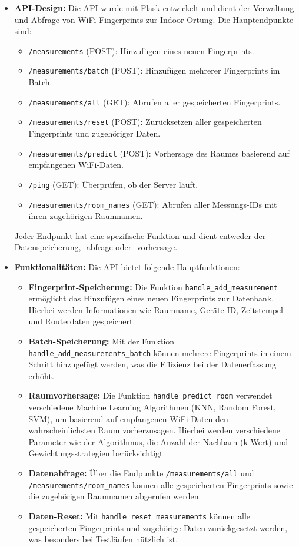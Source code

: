 \begin{itemize}
    \item \textbf{API-Design:} Die API wurde mit Flask entwickelt und dient der Verwaltung und Abfrage von WiFi-Fingerprints zur Indoor-Ortung. Die Hauptendpunkte sind:
          \begin{itemize}
              \item \texttt{/measurements} (POST): Hinzufügen eines neuen Fingerprints.
              \item \texttt{/measurements/batch} (POST): Hinzufügen mehrerer Fingerprints im Batch.
              \item \texttt{/measurements/all} (GET): Abrufen aller gespeicherten Fingerprints.
              \item \texttt{/measurements/reset} (POST): Zurücksetzen aller gespeicherten Fingerprints und zugehöriger Daten.
              \item \texttt{/measurements/predict} (POST): Vorhersage des Raumes basierend auf empfangenen WiFi-Daten.
              \item \texttt{/ping} (GET): Überprüfen, ob der Server läuft.
              \item \texttt{/measurements/room\_names} (GET): Abrufen aller Messungs-IDs mit ihren zugehörigen Raumnamen.
          \end{itemize}
          Jeder Endpunkt hat eine spezifische Funktion und dient entweder der Datenspeicherung, -abfrage oder -vorhersage.

    \item \textbf{Funktionalitäten:} Die API bietet folgende Hauptfunktionen:
          \begin{itemize}
              \item \textbf{Fingerprint-Speicherung:} Die Funktion \texttt{handle\_add\_measurement} ermöglicht das Hinzufügen eines neuen Fingerprints zur Datenbank. Hierbei werden Informationen wie Raumname, Geräte-ID, Zeitstempel und Routerdaten gespeichert.
              \item \textbf{Batch-Speicherung:} Mit der Funktion \texttt{handle\_add\_measurements\_batch} können mehrere Fingerprints in einem Schritt hinzugefügt werden, was die Effizienz bei der Datenerfassung erhöht.
              \item \textbf{Raumvorhersage:} Die Funktion \texttt{handle\_predict\_room} verwendet verschiedene Machine Learning Algorithmen (KNN, Random Forest, SVM), um basierend auf empfangenen WiFi-Daten den wahrscheinlichsten Raum vorherzusagen. Hierbei werden verschiedene Parameter wie der Algorithmus, die Anzahl der Nachbarn (k-Wert) und Gewichtungsstrategien berücksichtigt.
              \item \textbf{Datenabfrage:} Über die Endpunkte \texttt{/measurements/all} und \texttt{/measurements/room\_names} können alle gespeicherten Fingerprints sowie die zugehörigen Raumnamen abgerufen werden.
              \item \textbf{Daten-Reset:} Mit \texttt{handle\_reset\_measurements} können alle gespeicherten Fingerprints und zugehörige Daten zurückgesetzt werden, was besonders bei Testläufen nützlich ist.
          \end{itemize}


\end{itemize}
